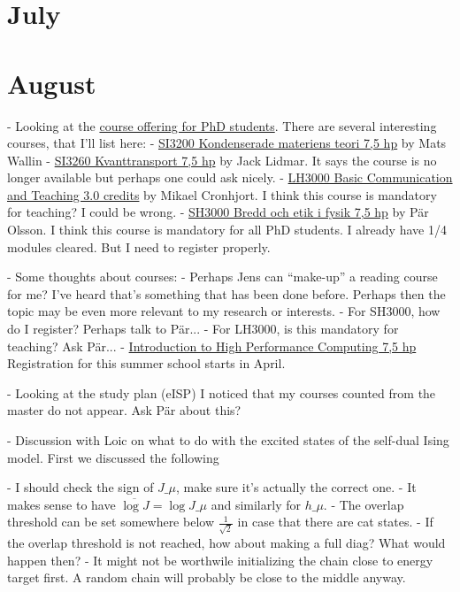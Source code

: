 \documentclass[a4paper]{article}
\begin{document}
\section*{July}
\begin{markdown}

\end{markdown}


\section*{August}
\begin{markdown}
- Looking at the \href{https://www.kth.se/student/kurser/org/SH}{course offering for PhD students}. There are several interesting courses, that I'll list here:
	- \href{https://www.kth.se/student/kurser/kurs/SI3200}{SI3200 Kondenserade materiens teori 7,5 hp} by Mats Wallin
	- \href{https://www.kth.se/student/kurser/kurs/SI3260}{SI3260 Kvanttransport 7,5 hp} by Jack Lidmar. It says the course is no longer available but perhaps one could ask nicely. 
	- \href{https://www.kth.se/student/kurser/kurs/LH3000}{LH3000 Basic Communication and Teaching 3.0 credits} by Mikael Cronhjort. I think this course is mandatory for teaching? I could be wrong.
	- \href{https://www.kth.se/student/kurser/kurs/SH3000}{SH3000 Bredd och etik i fysik 7,5 hp} by Pär Olsson. I think this course is mandatory for all PhD students. I already have 1/4 modules cleared. But I need to register properly.
	
	
	
- Some thoughts about courses: 
	- Perhaps Jens can ``make-up'' a reading course for me? I've heard that's something that has been done before. Perhaps then the topic may be even more relevant to my research or interests.
	- For SH3000, how do I register? Perhaps talk to Pär...
	- For LH3000, is this mandatory for teaching? Ask Pär...
	- \href{http://agenda.albanova.se/conferenceDisplay.py?confId=6537}{Introduction to High Performance Computing 7,5 hp} Registration for this summer school starts in April. 
	
- Looking at the study plan (eISP) I noticed that my courses counted from the master do not appear. Ask Pär about this? 

- Discussion with Loic on what to do with the excited states of the self-dual Ising model. First we discussed the following

	- I should check the sign of $J\_\mu$, make sure it's actually the correct one. 
	- It makes sense to have $\overline{\log J} = \log J\_\mu$ and similarly for $h\_\mu$.
	- The overlap threshold can be set somewhere below $\frac{1}{\sqrt{2}}$ in case that there are cat states. 
	- If the overlap threshold is not reached, how about making a full diag? What would happen then?
	- It might not be worthwile initializing the chain close to energy target first. A random chain will probably be close to the middle anyway.
	

\end{markdown}
\end{document}
